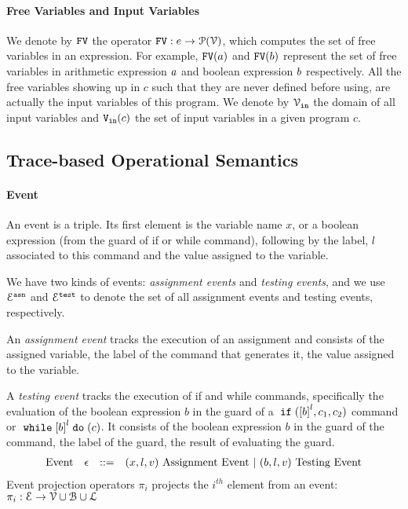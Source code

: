 \paragraph{Free Variables and Input Variables}
  We denote by $\mathtt{FV}$ the operator $\mathtt{FV}: e \to \mathcal{P}(\mathcal{V})$, which computes the set of free variables in an expression. For example,
  $\mathtt{FV}(a)$ and $\mathtt{FV}(b)$ represent the set of free variables in arithmetic
  expression $a$ and boolean expression $b$ respectively.
  All the free variables
  showing up in $c$ such that they are never defined before using, are actually the input variables of this program.
  We denote by $\mathcal{V}_{\mathtt{in}}$ the domain of all input variables and $\mathtt{V_{\mathtt{in}}}(c)$ the set of input variables in a given program $c$.

\subsection{{Trace-based Operational Semantics}}
\label{sec:operational_semantics}
\paragraph{Event}
An event is a triple.
Its first element is the variable name $x$,
or a boolean expression (from the guard of if or while command), 
following by 
 the label, $l$ associated to this command and the value assigned to the variable.

 We have two kinds of events: \emph{assignment events} and \emph{testing events},
 and we use $\mathcal{E}^{\mathtt{{asn}}}$ and $\mathcal{E}^{\mathtt{{test}}}$ to denote the set of all assignment events and testing events, respectively.

 An \emph{assignment event} tracks the execution of an assignment and consists of the assigned variable, the label of the command that generates it, the value assigned to the variable.

 A \emph{testing event} tracks the execution of if and while commands, specifically the evaluation of the boolean expression $b$ in the guard of a $\eif(\clabel{b}^l, c_1, c_2)$ command or $\ewhile \clabel{b}^l \edo (c)$.
 It consists of the boolean expression $b$ in the guard of the command, the label of the guard, the result of evaluating the guard.
%
\[
\begin{array}{llll}
  \mbox{Event} 
  & \mathtt{\epsilon} & ::= & 
  ({x}, l, v) ~ \mbox{Assignment Event} 
  ~|~(b, l, v) ~ \mbox{Testing Event}
\end{array}
\]
Event projection operators $\pi_i$ projects the $i^{th}$ element from an event: 
$\pi_i : 
\mathcal{E} \to \mathcal{V} \cup \mathcal{B} \cup \mathcal{L} $

